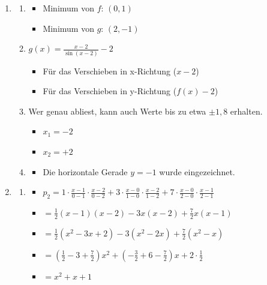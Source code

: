 \documentclass[12pt]{article}
\begin{document}
\begin{enumerate}

\item
\begin{enumerate}

\item
\begin{itemize}
\item Minimum von $f$: $(0,1)$ 
\item Minimum von $g$: $(2,-1)$ 
\end{itemize}

\item $g(x) = \frac{x-2}{\sin(x-2)}-2$
\begin{itemize}
\item Für das Verschieben in x-Richtung ($x-2$)
\item Für das Verschieben in y-Richtung ($f(x)-2$)
\end{itemize}

\item Wer genau abliest, kann auch Werte bis zu etwa $\pm 1{,8}$ erhalten.
\begin{itemize}
\item $x_1=-2$
\item $x_2=+2$
\end{itemize}

\item
\begin{itemize}
\item Die horizontale Gerade $y=-1$ wurde eingezeichnet. 
\end{itemize}

\end{enumerate}

\item
\begin{enumerate}

\item
\begin{itemize}
\item $p_2 =
1\cdot\frac{x-1}{0-1}\cdot\frac{x-2}{0-2} +
3\cdot\frac{x-0}{1-0}\cdot \frac{x-2}{1-2} +
7\cdot\frac{x-0}{2-0}\cdot\frac{x-1}{2-1}$
\item $=\frac{1}{2}(x-1)(x-2)-3x(x-2)+\frac{7}{2}x(x-1)$
\item $=\frac{1}{2}(x^2-3x+2)-3(x^2-2x)+\frac{7}{2}(x^2-x)$
\item $=(\frac{1}{2}-3+\frac{7}{2})x^2+(-\frac{3}{2}+6-\frac{7}{2})x+2\cdot\frac{1}{2}$
\item $=x^2+x+1$
\end{itemize}


\end{enumerate}
\end{enumerate}
\end{document}
